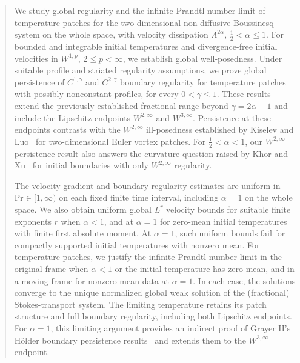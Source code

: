 \documentclass[reqno,11pt,a4paper]{amsart}
\begin{document}
\begin{abstract}
We study  global regularity and the infinite Prandtl number
limit of temperature patches for the two-dimensional
non-diffusive Boussinesq system on the whole space,
with velocity dissipation $\Lambda^{2\alpha}$,
$\frac12<\alpha\leq1$.
For bounded and integrable initial temperatures
and divergence-free initial velocities in $W^{1,p}$,
$2\leq p<\infty$, we establish global well-posedness.
Under suitable profile and striated regularity assumptions,
we prove global persistence of $C^{1,\gamma}$ and
$C^{2,\gamma}$ boundary regularity for temperature patches
with possibly nonconstant profiles, for every $0<\gamma\leq1$.
These results extend the previously established fractional
range beyond $\gamma=2\alpha-1$ and include the Lipschitz
endpoints $W^{2,\infty}$ and $W^{3,\infty}$.
Persistence at these endpoints contrasts with
the $W^{2,\infty}$ ill-posedness established
by Kiselev and Luo~\cite{KL23}
for two-dimensional Euler vortex patches.
For $\frac12<\alpha<1$, our $W^{2,\infty}$ persistence
result also answers the curvature question raised
by Khor and Xu~\cite{KX22} 
for initial boundaries
with only $W^{2,\infty}$ regularity.

The velocity gradient and boundary regularity estimates
are uniform in $\mathrm{Pr}\in[1,\infty)$
on each fixed finite time interval,
including $\alpha=1$ on the whole space.
We also obtain uniform global $L^r$ velocity bounds
for suitable finite exponents $r$ when $\alpha<1$,
and at $\alpha=1$ for zero-mean initial temperatures
with finite first absolute moment.
At $\alpha=1$, such uniform bounds fail for compactly supported
initial temperatures with nonzero mean.
For temperature patches, we justify the infinite
Prandtl number limit in the original frame
when $\alpha<1$ or the initial temperature has zero mean,
and in a moving frame for nonzero-mean data at $\alpha=1$.
In each case, the solutions converge
to the unique normalized global weak solution
of the (fractional) Stokes-transport system.
The limiting temperature retains its patch structure
and full boundary regularity, including both
Lipschitz endpoints.
For $\alpha=1$, this limiting argument provides
an indirect proof of Grayer II's H\"older boundary
persistence results~\cite{Gray23}
and extends them to the $W^{3,\infty}$ endpoint.
\end{abstract}

\maketitle
\tableofcontents
\vspace{-1cm}
\end{document}
